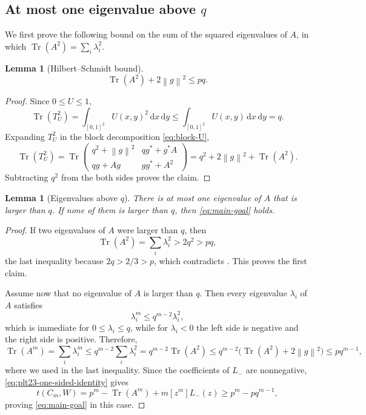 \documentclass[11pt]{article}
\newtheorem{lemma}[theorem]{Lemma}
\numberwithin{equation}{section}
\newcommand{\norm}[1]{\left\lVert #1\right\rVert}
\newcommand{\Tr}{\operatorname{Tr}}
\newcommand{\dd}{\,\mathrm d}
\begin{document}
\subsection{At most one eigenvalue above \texorpdfstring{$q$}{q}}

We first prove the following bound on the sum of the squared eigenvalues of
$A$, in which $\Tr(A^2)=\sum_i\lambda_i^2$.

\begin{lemma}[Hilbert--Schmidt bound]\label{lem:plt23-HS-bound}
  \begin{equation}\label{eq:plt23-HS-bound}
    \Tr(A^2)+2\norm g^2\le pq.
  \end{equation}
\end{lemma}

\begin{proof}
  Since $0\le U\le1$,
  \[
    \Tr(T_U^2)=\int_{[0,1]^2}U(x,y)^2\dd x\dd y
    \le\int_{[0,1]^2}U(x,y)\dd x\dd y=q.
  \]
  Expanding $T_U^2$ in the block decomposition \eqref{eq:block-U},
  \[
    \Tr(T_U^2)=\Tr\begin{pmatrix}q^2 + \norm g^2 & q g^* + g^* A \\ qg + Ag & g g^* + A^2\end{pmatrix}=q^2+2\norm g^2+\Tr(A^2).
  \]
  Subtracting $q^2$ from the both sides proves the claim.
\end{proof}

\begin{lemma}[Eigenvalues above $q$]\label{lem:plt23-eigenvalues-above-q}
  There is at most one eigenvalue of $A$ that is larger than $q$.  If none of
  them is larger than $q$, then \eqref{eq:main-goal} holds.
\end{lemma}

\begin{proof}
  If two eigenvalues of $A$ were larger than $q$, then
  \[
    \Tr(A^2)=\sum_i\lambda_i^2>2q^2>pq,
  \]
  the last inequality because $2q>2/3>p$, which contradicts
  .  This proves the first claim.

  Assume now that no eigenvalue of $A$ is larger than $q$.  Then every
  eigenvalue $\lambda_i$ of $A$ satisfies
  \[
    \lambda_i^m\le q^{m-2}\lambda_i^2,
  \]
  which is immediate for $0\le\lambda_i\le q$, while for $\lambda_i<0$ the left side is negative and the right side is positive.
  Therefore,
  \[
    \Tr(A^m) = \sum_{i}\lambda_i^m\le q^{m-2} \sum_{i} \lambda_i^2 = q^{m-2} \Tr(A^2) \le q^{m-2} \bigl(\Tr(A^2) + 2\norm g^2\bigr) \le pq^{m-1},
  \]
  where we used  in the last inequality.
  Since the coefficients of $L_-$ are nonnegative, \eqref{eq:plt23-one-sided-identity} gives
  \[
    t(C_m,W) = p^m - \Tr(A^m) + m[z^m]L_-(z) \ge p^m - pq^{m-1},
  \]
  proving \eqref{eq:main-goal} in this case.
\end{proof}
\end{document}
